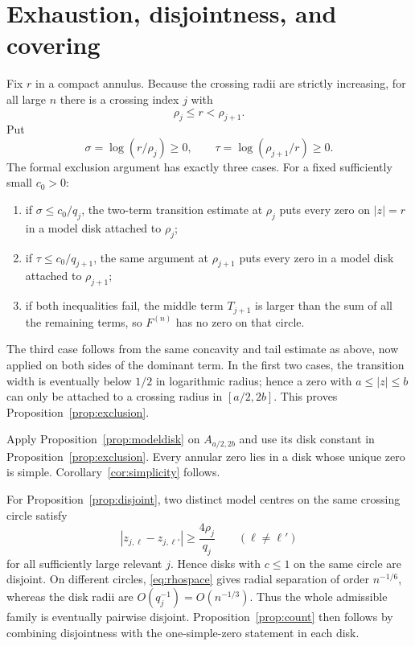 \documentclass[11pt,reqno]{amsart}
\numberwithin{equation}{section}
\theoremstyle{remark}
\begin{document}
\section{Exhaustion, disjointness, and covering}\label{sec:global}

Fix $r$ in a compact annulus.  Because the crossing radii are strictly increasing, for all large $n$ there is a crossing index $j$ with
\begin{equation}\label{eq:bracket}
 \rho_j\le r<\rho_{j+1}.
\end{equation}
Put
\[
 \sigma=\log(r/\rho_j)\ge0,
 \qquad
 \tau=\log(\rho_{j+1}/r)\ge0.
\]
The formal exclusion argument has exactly three cases.  For a fixed sufficiently small $c_0>0$:
\begin{enumerate}
 \item if $\sigma\le c_0/q_j$, the two-term transition estimate at $\rho_j$ puts every zero on $|z|=r$ in a model disk attached to $\rho_j$;
 \item if $\tau\le c_0/q_{j+1}$, the same argument at $\rho_{j+1}$ puts every zero in a model disk attached to $\rho_{j+1}$;
 \item if both inequalities fail, the middle term $T_{j+1}$ is larger than the sum of all the remaining terms, so $F^{(n)}$ has no zero on that circle.
\end{enumerate}
The third case follows from the same concavity and tail estimate as above, now applied on both sides of the dominant term.  In the first two cases, the transition width is eventually below $1/2$ in logarithmic radius; hence a zero with $a\le|z|\le b$ can only be attached to a crossing radius in $[a/2,2b]$.  This proves Proposition~\ref{prop:exclusion}.

Apply Proposition~\ref{prop:modeldisk} on $A_{a/2,2b}$ and use its disk constant in Proposition~\ref{prop:exclusion}.  Every annular zero lies in a disk whose unique zero is simple.  Corollary~\ref{cor:simplicity} follows.

For Proposition~\ref{prop:disjoint}, two distinct model centres on the same crossing circle satisfy
\begin{equation}\label{eq:angularsep}
 |z_{j,\ell}-z_{j,\ell'}|\ge\frac{4\rho_j}{q_j}
 \qquad(\ell\ne\ell')
\end{equation}
for all sufficiently large relevant $j$.  Hence disks with $c\le1$ on the same circle are disjoint.  On different circles, \eqref{eq:rhospace} gives radial separation of order $n^{-1/6}$, whereas the disk radii are $O(q_j^{-1})=O(n^{-1/3})$.  Thus the whole admissible family is eventually pairwise disjoint.  Proposition~\ref{prop:count} then follows by combining disjointness with the one-simple-zero statement in each disk.
\end{document}
